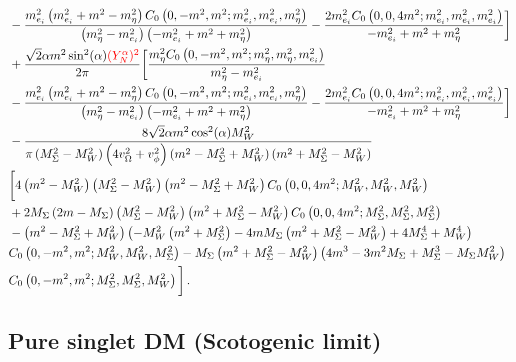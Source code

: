 \documentclass[12pt,letterpaper]{article}
\begin{document}
\begin{align}
&-\frac{m_{e_i}^2 \left(m_{e_i}^2+m^2-m_{\eta }^2\right) C_0\left(0,-m^2,m^2;m_{e_i}^2,m_{e_i}^2,m_{\eta
   }^2\right)}{\left(m_{\eta }^2-m_{e_i}^2\right) \left(-m_{e_i}^2+m^2+m_{\eta }^2\right)}-\frac{2 m_{e_i}^2 C_0\left(0,0,4 m^2;m_{e_i}^2,m_{e_i}^2,m_{e_i}^2\right)}{-m_{e_i}^2+m^2+m_{\eta }^2}
\bigg]\nonumber\\
&+
\frac{\sqrt{2} \alpha  m^2 \sin ^2(\alpha ) {\color{red}(Y_N^{\alpha })^2}}{2\pi }
\bigg[
\frac{m_{\eta }^2 C_0\left(0,-m^2,m^2;m_{\eta }^2,m_{\eta }^2,m_{e_i}^2\right)}{m_{\eta }^2-m_{e_i}^2}\nonumber\\
&-\frac{m_{e_i}^2 \left(m_{e_i}^2+m^2-m_{\eta }^2\right) C_0\left(0,-m^2,m^2;m_{e_i}^2,m_{e_i}^2,m_{\eta
   }^2\right)}{\left(m_{\eta }^2-m_{e_i}^2\right) \left(-m_{e_i}^2+m^2+m_{\eta }^2\right)}-\frac{2 m_{e_i}^2 C_0\left(0,0,4 m^2;m_{e_i}^2,m_{e_i}^2,m_{e_i}^2\right)}{-m_{e_i}^2+m^2+m_{\eta }^2}
\bigg]\nonumber\\
&-
\frac{8 \sqrt{2} \alpha  m^2 \cos ^2(\alpha ) M_W^2}{\pi  \left(M_{\Sigma }^2-M_W^2\right) \left(4 v_{\Omega }^2+v_{\phi }^2\right) \left(m^2-M_{\Sigma }^2+M_W^2\right) \left(m^2+M_{\Sigma }^2-M_W^2\right)}\nonumber\\
&
\bigg[
4 \left(m^2-M_W^2\right) \left(M_{\Sigma }^2-M_W^2\right) \left(m^2-M_{\Sigma }^2+M_W^2\right) C_0\left(0,0,4 m^2;M_W^2,M_W^2,M_W^2\right)\nonumber\\
&+2 M_{\Sigma } \left(2 m-M_{\Sigma }\right) \left(M_{\Sigma }^2-M_W^2\right)
   \left(m^2+M_{\Sigma }^2-M_W^2\right) C_0\left(0,0,4 m^2;M_{\Sigma }^2,M_{\Sigma }^2,M_{\Sigma }^2\right)\nonumber\\
   &-\left(m^2-M_{\Sigma }^2+M_W^2\right) \left(-M_W^2 \left(m^2+M_{\Sigma }^2\right)-4 m M_{\Sigma }
   \left(m^2+M_{\Sigma }^2-M_W^2\right)+4 M_{\Sigma }^4+M_W^4\right)\nonumber\\
   & C_0\left(0,-m^2,m^2;M_W^2,M_W^2,M_{\Sigma }^2\right)-M_{\Sigma } \left(m^2+M_{\Sigma }^2-M_W^2\right) \left(4 m^3-3 m^2 M_{\Sigma }+M_{\Sigma
   }^3-M_{\Sigma } M_W^2\right)\nonumber\\
   & C_0\left(0,-m^2,m^2;M_{\Sigma }^2,M_{\Sigma }^2,M_W^2\right)
\bigg]\,.
\end{align}

\subsection{Pure singlet DM (Scotogenic limit)}
\label{sec:pure-singlet-sigmagg}
\end{document}
